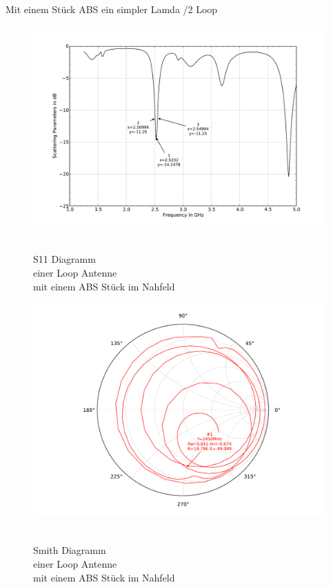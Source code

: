 Mit einem Stück ABS ein simpler Lamda /2 Loop
\begin{figure}[!h]
\begin{center}
  \includegraphics[width=\linewidth]{content/bilder/Evaluation/Loop/mit1ABS/S11_Loop_Coil_1ABS.pdf}
  \caption{\\S11 Diagramm \\einer Loop Antenne \\mit einem ABS Stück im Nahfeld}\label{fig:S11_Loop_1ABS_3}
\endminipage%
{}
  \includegraphics[width=\linewidth]{content/bilder/Evaluation/Loop/mit1ABS/Smith_Loop_Coil_1ABS.pdf}
  \caption{\\Smith Diagramm \\einer Loop Antenne \\ mit einem ABS Stück im Nahfeld}\label{fig:Smith_Loop_1ABS_4}
\endminipage
\end{center}
\end{figure}
